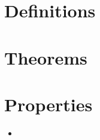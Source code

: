 \documentclass{article} %
\theoremstyle{plain}
\theoremstyle{definition}
\theoremstyle{case}
\begin{document}
\newpage

\section*{Definitions}

\section*{Theorems}

\section*{Properties}
  \begin{itemize}
        \item
  \end{itemize}
\end{document}
